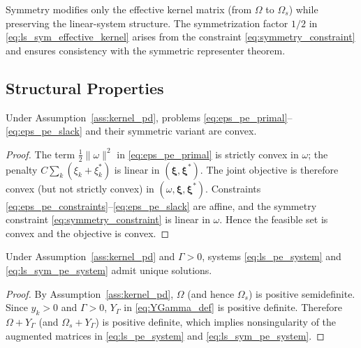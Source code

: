 \documentclass[mathematics,article,submit,pdftex,moreauthors]{Definitions/mdpi}
\begin{document}
\begin{Remark}\label{rem:ls_sym_mechanism}
Symmetry modifies only the effective kernel matrix (from $\Omega$ to $\Omega_s$) while preserving the linear-system structure. 
The symmetrization factor $1/2$ in \eqref{eq:ls_sym_effective_kernel} arises from the constraint \eqref{eq:symmetry_constraint} 
and ensures consistency with the symmetric representer theorem.
\end{Remark}


\subsection{Structural Properties}\label{subsec:structural_properties}

\begin{Proposition}\label{prop:eps_convex}
Under Assumption~\ref{ass:kernel_pd}, problems \eqref{eq:eps_pe_primal}--\eqref{eq:eps_pe_slack} 
and their symmetric variant are convex.
\end{Proposition}

\begin{proof}
The term $\frac{1}{2}\|\omega\|^2$ in \eqref{eq:eps_pe_primal} is strictly convex in $\omega$; the penalty $C\sum_k(\xi_k+\xi_k^*)$ is linear in $(\boldsymbol{\xi},\boldsymbol{\xi}^*)$. The joint objective is therefore convex (but not strictly convex) in $(\omega,\boldsymbol{\xi},\boldsymbol{\xi}^*)$.
Constraints \eqref{eq:eps_pe_constraints}--\eqref{eq:eps_pe_slack} are affine, and the symmetry constraint \eqref{eq:symmetry_constraint} is linear in $\omega$. 
Hence the feasible set is convex and the objective is convex.
\end{proof}

\begin{Proposition}\label{prop:ls_unique}
Under Assumption~\ref{ass:kernel_pd} and $\Gamma>0$, systems \eqref{eq:ls_pe_system} and \eqref{eq:ls_sym_pe_system} 
admit unique solutions.
\end{Proposition}

\begin{proof}
By Assumption~\ref{ass:kernel_pd}, $\Omega$ (and hence $\Omega_s$) is positive semidefinite. 
Since $y_k>0$ and $\Gamma>0$, $Y_\Gamma$ in \eqref{eq:YGamma_def} is positive definite. 
Therefore $\Omega+Y_\Gamma$ (and $\Omega_s + Y_\Gamma$) is positive definite, 
which implies nonsingularity of the augmented matrices in \eqref{eq:ls_pe_system} and \eqref{eq:ls_sym_pe_system}.
\end{proof}
\end{document}

